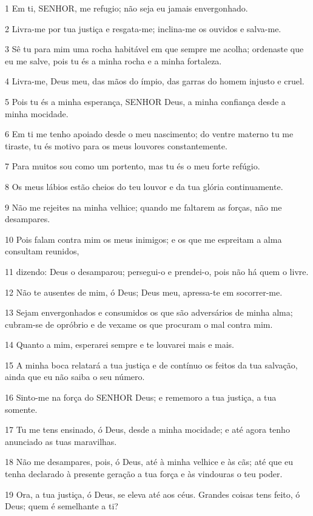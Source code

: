 \par 1 Em ti, SENHOR, me refugio; não seja eu jamais envergonhado.
\par 2 Livra-me por tua justiça e resgata-me; inclina-me os ouvidos e salva-me.
\par 3 Sê tu para mim uma rocha habitável em que sempre me acolha; ordenaste que eu me salve, pois tu és a minha rocha e a minha fortaleza.
\par 4 Livra-me, Deus meu, das mãos do ímpio, das garras do homem injusto e cruel.
\par 5 Pois tu és a minha esperança, SENHOR Deus, a minha confiança desde a minha mocidade.
\par 6 Em ti me tenho apoiado desde o meu nascimento; do ventre materno tu me tiraste, tu és motivo para os meus louvores constantemente.
\par 7 Para muitos sou como um portento, mas tu és o meu forte refúgio.
\par 8 Os meus lábios estão cheios do teu louvor e da tua glória continuamente.
\par 9 Não me rejeites na minha velhice; quando me faltarem as forças, não me desampares.
\par 10 Pois falam contra mim os meus inimigos; e os que me espreitam a alma consultam reunidos,
\par 11 dizendo: Deus o desamparou; persegui-o e prendei-o, pois não há quem o livre.
\par 12 Não te ausentes de mim, ó Deus; Deus meu, apressa-te em socorrer-me.
\par 13 Sejam envergonhados e consumidos os que são adversários de minha alma; cubram-se de opróbrio e de vexame os que procuram o mal contra mim.
\par 14 Quanto a mim, esperarei sempre e te louvarei mais e mais.
\par 15 A minha boca relatará a tua justiça e de contínuo os feitos da tua salvação, ainda que eu não saiba o seu número.
\par 16 Sinto-me na força do SENHOR Deus; e rememoro a tua justiça, a tua somente.
\par 17 Tu me tens ensinado, ó Deus, desde a minha mocidade; e até agora tenho anunciado as tuas maravilhas.
\par 18 Não me desampares, pois, ó Deus, até à minha velhice e às cãs; até que eu tenha declarado à presente geração a tua força e às vindouras o teu poder.
\par 19 Ora, a tua justiça, ó Deus, se eleva até aos céus. Grandes coisas tens feito, ó Deus; quem é semelhante a ti?
